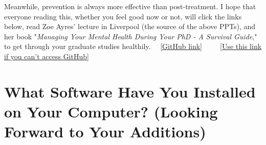 Meanwhile, prevention is always more effective than post-treatment. I hope that everyone reading this, whether you feel good now or not, will click the links below, read Zoe Ayres' lecture in Liverpool (the source of the above PPTs), and her book "\textit{Managing Your Mental Health During Your PhD - A Survival Guide}," to get through your graduate studies healthily. ~~\href{https://github.com/xp-pgrs-unofficial-guide/xp_pgrs_unofficial_guide/tree/main/fileshare}{[GitHub link]}~~~~~\href{https://gitee.com/kaiwu-astro/xp_pgrs_unofficial_guide/tree/main/fileshare}{[Use this link if you can't access GitHub]}

\section{What Software Have You Installed on Your Computer? (Looking Forward to Your Additions)}


